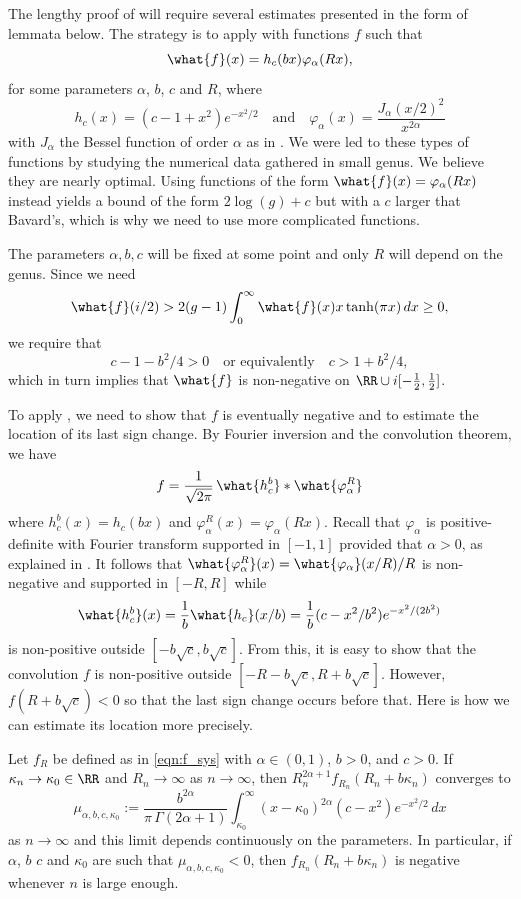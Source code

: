\documentclass[12pt]{amsart}
\numberwithin{equation}{section}
\begin{document}
The lengthy proof of  will require several estimates presented in the form of lemmata below. The strategy is to apply  with functions $f$ such that
\[
\what{f}(x) = h_{c}(bx) \varphi_\alpha(Rx),
\]
for some parameters $\alpha$, $b$, $c$ and $R$, where 
\[
h_{c}(x)= (c-1+x^2) e^{-x^2/2} \quad \text{and} \quad \varphi_\alpha(x) = \frac{J_\alpha(x/2)^2}{x^{2\alpha}}
\]
 with $J_\alpha$ the Bessel function of order $\alpha$ as in . We were led to these types of functions by studying the numerical data gathered in small genus. We believe they are nearly optimal. Using functions of the form $\what{f}(x) = \varphi_\alpha(Rx)$ instead yields a bound of the form $2\log(g) + c$ but with a $c$ larger that Bavard's, which is why we need to use more complicated functions.
 
The parameters $\alpha, b, c$ will be fixed at some point and only $R$ will depend on the genus. Since we need 
\[
\what{f}(i/2) > 2(g-1) \int_0^\infty \what{f}(x) x \tanh(\pi x) \, dx \geq 0,
\]
 we require that
\[
c-1-b^2/4 > 0  \quad \text{or equivalently} \quad c > 1 + b^2/4,
\] 
which in turn implies that $\what{f}$ is non-negative on $\RR \cup i [-\frac12,\frac12]$.

To apply , we need to show that $f$ is eventually negative and to estimate the location of its last sign change. By Fourier inversion and the convolution theorem, we have
\begin{equation} \label{eqn:f_sys}
f = \frac{1}{\sqrt{2\pi}} \, \what{h_{c}^b}\ast \what{\varphi_\alpha^{R}}
\end{equation}
where $h_{c}^b(x)=h_c(bx)$ and $\varphi_\alpha^R(x) = \varphi_\alpha(Rx)$. Recall that $\varphi_\alpha$ is positive-definite with Fourier transform supported in $[-1,1]$ provided that $\alpha>0$, as explained in . It follows that $\what{\varphi_\alpha^{R}}(x) = \what{\varphi_\alpha}(x/R)/R$ is non-negative and supported in $[-R,R]$ while
\[
\what{h_{c}^b}(x) =\frac1b \what{h_{c}}(x/b) = \frac{1}{b}(c-x^2/b^2) e^{-x^2/(2b^2)}
\]
is non-positive outside $[-b\sqrt{c},b\sqrt{c}]$. From this, it is easy to show that the convolution $f$ is non-positive outside $[-R-b\sqrt{c},R+b\sqrt{c}]$. However, $f(R+b\sqrt{c})<0$ so that the last sign change occurs before that. Here is how we can estimate its location more precisely.

\begin{lem} \label{lem:pointwise_criterion}
Let $f_R$ be defined as in \eqref{eqn:f_sys} with $\alpha \in (0,1)$, $b>0$, and $c > 0$. If $\kappa_n\to \kappa_0 \in \RR$ and $R_n\to \infty$ as $n\to \infty$, then $R_n^{2\alpha+1} f_{R_n}(R_n+b\kappa_n)$ converges to
\[
\mu_{\alpha,b,c,\kappa_0}:= \frac{b^{2\alpha}}{\pi \, \Gamma(2\alpha+1)} \int_{\kappa_0}^\infty (x - \kappa_0)^{2\alpha} (c-x^2) e^{-x^2/2} \, dx
\]
as $n\to \infty$ and this limit depends continuously on the parameters. In particular, if $\alpha$, $b$ $c$ and $\kappa_0$ are such that $\mu_{\alpha,b,c,\kappa_0}<0$, then $f_{R_n}(R_n+b\kappa_n)$ is negative whenever $n$ is large enough.
\end{lem}
\end{document}
